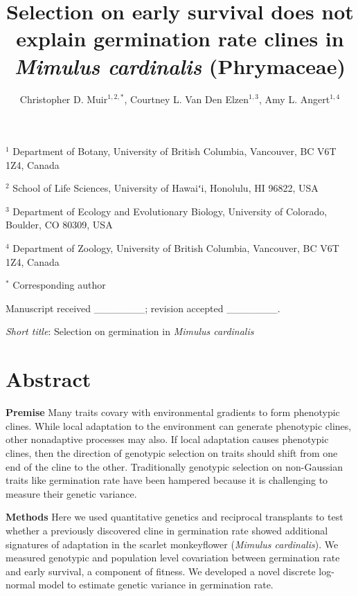 \documentclass[
  12pt,
]{article}
\title{Selection on early survival does not explain germination rate clines in \emph{Mimulus cardinalis} (Phrymaceae)}
\author{Christopher D. Muir\(^{1,2,*}\), Courtney L. Van Den Elzen\(^{1,3}\), Amy L. Angert\(^{1,4}\)}
\date{}
\makeatletter
\newcommand\iraggedright{%
  \let\\\@centercr\@rightskip\@flushglue \rightskip\@rightskip
  \leftskip\z@skip}
\makeatother
\begin{document}
\maketitle

\iraggedright

\newcommand{\pkg}[1]{{\fontseries{b}\selectfont #1}} 

\(^{1}\) Department of Botany, University of British Columbia, Vancouver, BC V6T 1Z4, Canada

\(^{2}\) School of Life Sciences, University of Hawaiʻi, Honolulu, HI 96822, USA

\(^{3}\) Department of Ecology and Evolutionary Biology, University of Colorado, Boulder, CO 80309, USA

\(^{4}\) Department of Zoology, University of British Columbia, Vancouver, BC V6T 1Z4, Canada

\(^{*}\) Corresponding author

Manuscript received \_\_\_\_\_\_\_; revision accepted \_\_\_\_\_\_\_.

\emph{Short title}: Selection on germination in \emph{Mimulus cardinalis}

\hypertarget{abstract}{%
\section{Abstract}\label{abstract}}

\textbf{Premise} Many traits covary with environmental gradients to form phenotypic clines. While local adaptation to the environment can generate phenotypic clines, other nonadaptive processes may also. If local adaptation causes phenotypic clines, then the direction of genotypic selection on traits should shift from one end of the cline to the other. Traditionally genotypic selection on non-Gaussian traits like germination rate have been hampered because it is challenging to measure their genetic variance.

\textbf{Methods} Here we used quantitative genetics and reciprocal transplants to test whether a previously discovered cline in germination rate showed additional signatures of adaptation in the scarlet monkeyflower (\emph{Mimulus cardinalis}). We measured genotypic and population level covariation between germination rate and early survival, a component of fitness. We developed a novel discrete log-normal model to estimate genetic variance in germination rate.
\end{document}
